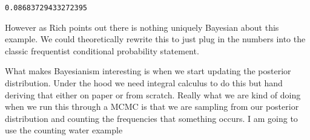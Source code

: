 \documentclass[
  letterpaper,
  DIV=11,
  numbers=noendperiod]{scrreprt}
\begin{document}
\begin{verbatim}
0.08683729433272395
\end{verbatim}

However as Rich points out there is nothing uniquely Bayesian about this
example. We could theoretically rewrite this to just plug in the numbers
into the classic frequentist conditional probability statement.

What makes Bayesianism interesting is when we start updating the
posterior distribution. Under the hood we need integral calculus to do
this but hand deriving that either on paper or from scratch. Really what
we are kind of doing when we run this through a MCMC is that we are
sampling from our posterior distribution and counting the frequencies
that something occurs. I am going to use the counting water example
\end{document}
